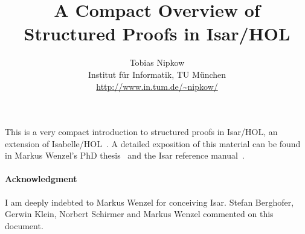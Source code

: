 \documentclass[11pt,a4paper]{article}
\begin{document}
\title{A Compact Overview of Structured Proofs in Isar/HOL}
\author{Tobias Nipkow\\Institut f{\"u}r Informatik, TU M{\"u}nchen\\
 {\small\url{http://www.in.tum.de/~nipkow/}}}
\date{}
\maketitle

\noindent
This is a very compact introduction to structured proofs in
Isar/HOL, an extension of Isabelle/HOL~\cite{LNCS2283}. A detailed
exposition of this material can be found in Markus Wenzel's PhD
thesis~\cite{Wenzel-PhD} and the Isar reference manual~\cite{Isar-Ref-Man}.



%


{\small
\paragraph{Acknowledgment}
I am deeply indebted to Markus Wenzel for conceiving Isar. Stefan Berghofer,
Gerwin Klein, Norbert Schirmer and Markus Wenzel commented on this document.
}

\begingroup
 \small\raggedright\frenchspacing

\endgroup
\end{document}
